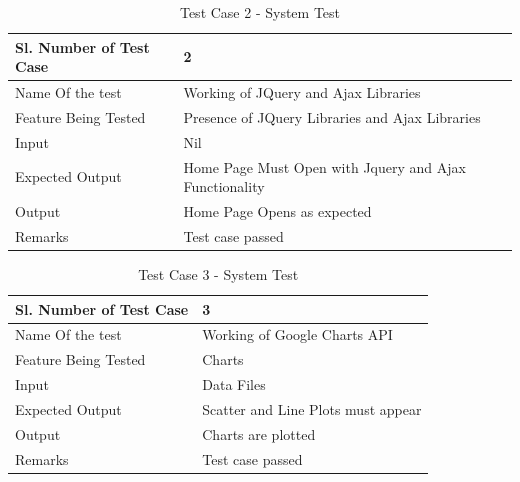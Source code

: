 \documentclass[12pt,a4paper]{report}
\begin{document}
\begin{table}
    \begin{tabular}{|l|l|}
    \hline
    Sl. Number of Test Case & 2                                                      \\ \hline
    Name Of the test        & Working of JQuery and Ajax Libraries                   \\ \hline
    Feature Being Tested    & Presence of JQuery Libraries and Ajax Libraries        \\ \hline
    Input                   & Nil                                                    \\ \hline
    Expected Output         & Home Page Must Open with Jquery and Ajax Functionality \\ \hline
    Output                  & Home Page Opens as expected                            \\ \hline
    Remarks                 & Test case passed                                       \\ \hline
    \end{tabular}
    \caption {Test Case 2 - System Test}
\end{table}





\begin{table}
    \begin{tabular}{|l|l|}
    \hline
    Sl. Number of Test Case & 3                                  \\ \hline
    Name Of the test        & Working of Google Charts API       \\ \hline
    Feature Being Tested    & Charts                             \\ \hline
    Input                   & Data Files                         \\ \hline
    Expected Output         & Scatter and Line Plots must appear \\ \hline
    Output                  & Charts are plotted                 \\ \hline
    Remarks                 & Test case passed                   \\ \hline
    \end{tabular}
    \caption {Test Case 3 - System Test}
\end{table}
\end{document}
